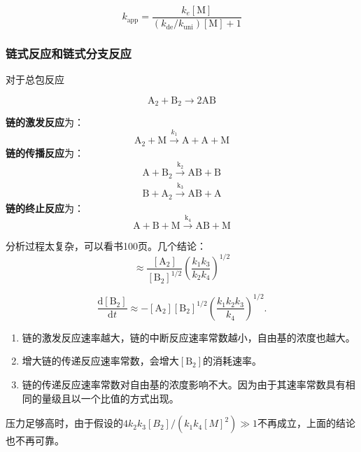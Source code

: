 \begin{equation}
    k_\mathrm{app}=\frac{k_e[\mathrm{M}]}{(k_\mathrm{de}/k_\mathrm{uni})[\mathrm{M}]+1}
\end{equation}

\subsubsection{链式反应和链式分支反应}

对于总包反应

\begin{equation}
    \mathrm{A_2+B_2}\rightarrow 2\mathrm{AB}
\end{equation}

\textbf{链的激发反应}为：
\begin{equation}
    \mathrm{A_2+M}\overset{k_1}{\longrightarrow} \mathrm{A+A+M}
\end{equation}
\textbf{链的传播反应}为：
\begin{eqnarray}
    \mathrm{A+B_2\overset{k_2}{\longrightarrow}AB + B}\\
    \mathrm{B+A_2\overset{k_3}{\longrightarrow}AB + A}
\end{eqnarray}
\textbf{链的终止反应}为：
\begin{equation}
    \mathrm{A+B+M\overset{k_4}{\longrightarrow}AB+M}
\end{equation}

分析过程太复杂，可以看书100页。几个结论：
\begin{equation}
    [\mathrm{A}]\approx{\frac{[\mathrm{A}_{2}]}{[\mathrm{B}_{2}]^{1/2}}}\left({\frac{k_{1}k_{3}}{k_{2}k_{4}}}\right)^{1/2}
\end{equation}

\begin{equation}
    \frac{\mathrm{d}[{\mathrm{B}}_{2}]}{\mathrm{d}t}\approx-[{\mathrm{A}}_{2}][{\mathrm{B}}_{2}]^{1/2}\left(\frac{k_{1}k_{2}k_{3}}{k_{4}}\right)^{1/2}.
\end{equation}
\begin{enumerate}
    \item 链的激发反应速率越大，链的中断反应速率常数越小，自由基的浓度也越大。
    \item 增大链的传递反应速率常数，会增大\([\mathrm{B_2}]\)的消耗速率。
    \item 链的传递反应速率常数对自由基的浓度影响不大。因为由于其速率常数具有相同的量级且以一个比值的方式出现。
\end{enumerate}

压力足够高时，由于假设的\(4k_2 k_3[B_2]/(k_1 k_4[M]^2)\gg 1\)不再成立，上面的结论也不再可靠。

